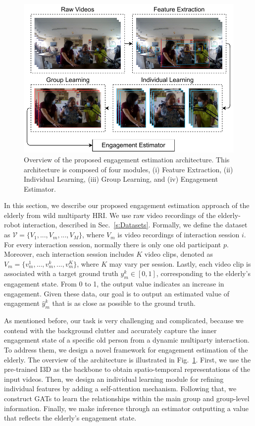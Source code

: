 \documentclass[10pt,journal,compsoc]{IEEEtran}
\begin{document}
\begin{figure}[t]
  \centering
  \includegraphics[width=\linewidth]{assets/architecture.drawio}
  \caption{Overview of the proposed engagement estimation architecture. This architecture is composed of four modules, (i) Feature Extraction, (ii) Individual Learning, (iii) Group Learning, and (iv) Engagement Estimator.}
  \label{f:architecture}
\end{figure}

In this section, we describe our proposed engagement estimation approach of the elderly from wild multiparty HRI. We use raw video recordings of the elderly-robot interaction, described in Sec.~\ref{s:Datasets}. Formally, we define the dataset as $\mathcal{V} = \{V_1, ..., V_m, ..., V_M\}$, where $V_m$ is video recordings of interaction session $i$. For every interaction session, normally there is only one old participant $p$. Moreover, each interaction session includes $K$ video clips, denoted as $V_m = \{v_m^1, ..., v_m^k, ..., v_m^K\}$, where $K$ may vary per session. Lastly, each video clip is associated with a target ground truth $y_m^k \in [0, 1]$, corresponding to the elderly's engagement state. From 0 to 1, the output value indicates an increase in engagement. Given these data, our goal is to output an estimated value of engagement $\hat{y}_m^k$ that is as close as possible to the ground truth.

As mentioned before, our task is very challenging and complicated, because we contend with the background clutter and accurately capture the inner engagement state of a specific old person from a dynamic multiparty interaction. To address them, we design a novel framework for engagement estimation of the elderly. The overview of the architecture is illustrated in Fig.~\ref{f:architecture}. First, we use the pre-trained I3D as the backbone to obtain spatio-temporal representations of the input videos. Then, we design an individual learning module for refining individual features by adding a self-attention mechanism. Following that, we construct GATs to learn the relationships within the main group and group-level information. Finally, we make inference through an estimator outputting a value that reflects the elderly's engagement state.
\end{document}
